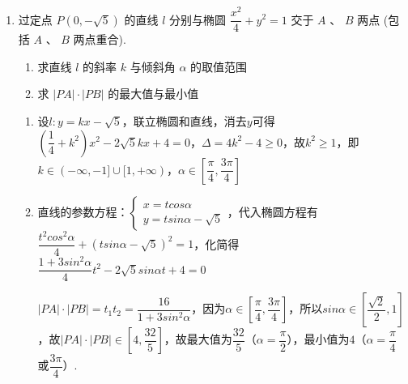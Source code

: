 \begin{enumerate}
    \item 过定点 $P\left( {0, - \sqrt{5}}\right)$ 的直线 $l$ 分别与椭圆 $\dfrac{{x}^{2}}{4} + {y}^{2} = 1$ 交于 $A\text{ 、 }B$ 两点 (包括 $A\text{ 、 }B$ 两点重合).
    \begin{enumerate}
        \item 求直线 $l$ 的斜率 $k$ 与倾斜角 $\alpha$ 的取值范围
        \item 求 $\left| {PA}\right|  \cdot  \left| {PB}\right|$ 的最大值与最小值
    \end{enumerate}
    \begin{jieda}
        \begin{enumerate}
            \item 设$l: y = kx-\sqrt{5}$，联立椭圆和直线，消去$y$可得$\left(\dfrac{1}{4}+k^2\right)x^2-2\sqrt{5}kx+4=0$，$\Delta = 4k^2-4 \geq 0$，故$k^2 \geq 1$，即$k \in (-\infty, -1] \cup [1, +\infty)$，$\alpha \in \left[\dfrac{\pi}{4}, \dfrac{3\pi}{4}\right]$
            \item 直线的参数方程：$\left\{\begin{array}{l}
                 x = tcos\alpha \\
                 y = tsin\alpha-\sqrt{5}
            \end{array}\right.$，代入椭圆方程有$\dfrac{t^2cos^2\alpha}{4}+(tsin\alpha-\sqrt{5})^2 = 1$，化简得$\dfrac{1 + 3sin^{2}\alpha}{4}{t}^{2} - 2\sqrt{5}sin\alpha{t} + 4 = 0$

            $|PA| \cdot |PB| = t_1t_2 = \dfrac{16}{1+3sin^2\alpha}$，因为$\alpha \in \left[\dfrac{\pi}{4}, \dfrac{3\pi}{4}\right]$，所以$sin\alpha \in \left[\dfrac{\sqrt{2}}{2}, 1\right]$，故$|PA| \cdot |PB| \in \left[4, \dfrac{32}{5}\right]$，故最大值为$\dfrac{32}{5}$（$\alpha = \dfrac{\pi}{2}$），最小值为$4$（$\alpha = \dfrac{\pi}{4}$或$\dfrac{3\pi}{4}$）.
        \end{enumerate}
    \end{jieda}
\end{enumerate}

